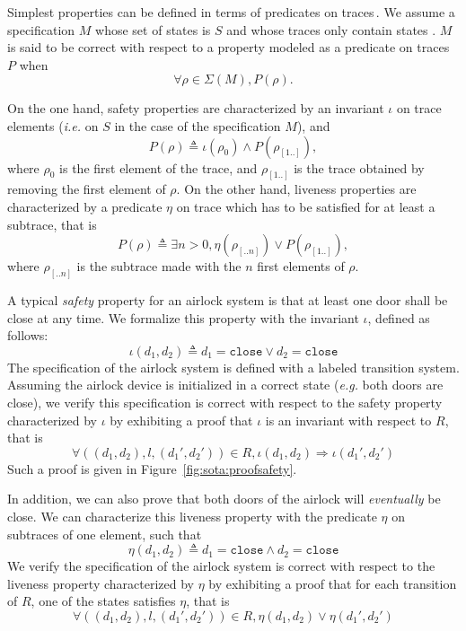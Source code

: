 Simplest properties can be defined in terms of predicates on
traces\,\cite{alpern1987recognizing,schneider2000enforceable,basin2013enforceable}.
%
We assume a specification \( M \) whose set of states is \( S \) and whose
traces only contain states .
%
\( M \) is said to be correct with respect to a property modeled as a predicate
on traces \( P \) when
%
\[
  \forall \rho \in \Sigma(M), P(\rho).
\]

On the one hand, safety properties are characterized by an invariant \( \iota \)
on trace elements (\emph{i.e.} on \( S \) in the case of the specification
\( M \)), and
%
\[
  P(\rho) \triangleq \iota(\rho_0) \wedge P(\rho_{[1..]}),
\]
%
where \( \rho_0 \) is the first element of the trace, and \( \rho_{[1..]} \) is
the trace obtained by removing the first element of \( \rho \).
%
On the other hand, liveness properties are characterized by a predicate
\( \eta \) on trace which has to be satisfied for at least a subtrace, that is
%
\[
  P(\rho) \triangleq \exists n > 0, \eta(\rho_{[..n]}) \vee P(\rho_{[1..]}),
\]
%
where \( \rho_{[..n]} \) is the subtrace made with the \( n \) first elements
of \( \rho \).

\begin{example}
  A typical \emph{safety} property for an airlock
  system is that at least one door shall be close at any time.
  We formalize this property with the invariant \( \iota \), defined as follows:
  \[
    \iota( d_1, d_2) \triangleq d_1 = \mathtt{close} \vee d_2 = \mathtt{close}
  \]
  The specification of the airlock system is defined with a labeled transition
  system.
  Assuming the airlock device is initialized in a correct state (\emph{e.g.}
  both doors are close), we verify this specification is correct with respect to
  the safety property characterized by \( \iota \) by exhibiting a proof that
  \( \iota \) is an invariant with respect to \( R \), that is
  \[
    \forall ((d_1, d_2), l, (d_1', d_2')) \in R, \iota(d_1, d_2) \Rightarrow
    \iota(d_1', d_2')
  \]
  Such a proof is given in Figure~\ref{fig:sota:proofsafety}. 

  In addition, we can also prove that both doors of the airlock will
  \emph{eventually} be close.
  We can characterize this liveness property with the predicate \( \eta \) on
  subtraces of one element, such that
  \[
    \eta(d_1, d_2) \triangleq d_1 = \mathtt{close} \wedge d_2 = \mathtt{close}
  \]
  We verify the specification of the airlock system is correct with respect to
  the liveness property characterized by \( \eta \) by exhibiting a proof that
  for each transition of \( R \), one of the states satisfies \( \eta \), that
  is
  \[
    \forall ((d_1, d_2), l, (d_1', d_2')) \in R, \eta(d_1, d_2) \vee \eta(d_1',
    d_2')
  \]

\end{example}

